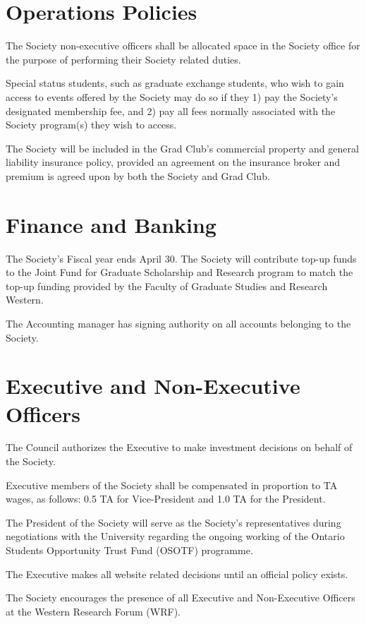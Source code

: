 \section{Operations Policies}
\begin{longenum}[ label*=\thesection.\arabic*., align=left]
\item The Society non-executive officers shall be allocated space in the Society office for the purpose of performing their Society related duties.
\item Special status students, such as graduate exchange students, who wish to gain access to events offered by the Society may do so if they 1) pay the Society’s designated membership fee, and 2) pay all fees normally associated with the Society program(s) they wish to access.
\item The Society will be included in the Grad Club’s commercial property and general liability insurance policy, provided an agreement on the insurance broker and premium is agreed upon by both the Society and Grad Club.
\end{longenum}

\section{Finance and Banking}
\begin{longenum}[ label*=\thesection.\arabic*., align=left]
\item The Society’s Fiscal year ends April 30. The Society will contribute top-up funds to the Joint Fund for Graduate Scholarship and Research program to match the top-up funding provided by the Faculty of Graduate Studies and Research Western.
\item The Accounting manager has signing authority on all accounts belonging to the Society.
\end{longenum}

\section{Executive and Non-Executive Officers}
\begin{longenum}[ label*=\thesection.\arabic*., align=left]
\item The Council authorizes the Executive to make investment decisions on behalf of the Society.
\item Executive members of the Society shall be compensated in proportion to TA wages, as follows: 0.5 TA for Vice-President and 1.0 TA for the President.
\item The President of the Society will serve as the Society’s representatives during negotiations with the University regarding the ongoing working of the Ontario Students Opportunity Trust Fund (OSOTF) programme.
\item The Executive makes all website related decisions until an official policy exists.
\item The Society encourages the presence of all Executive and Non-Executive Officers at the Western Research Forum (WRF).
\end{longenum}


